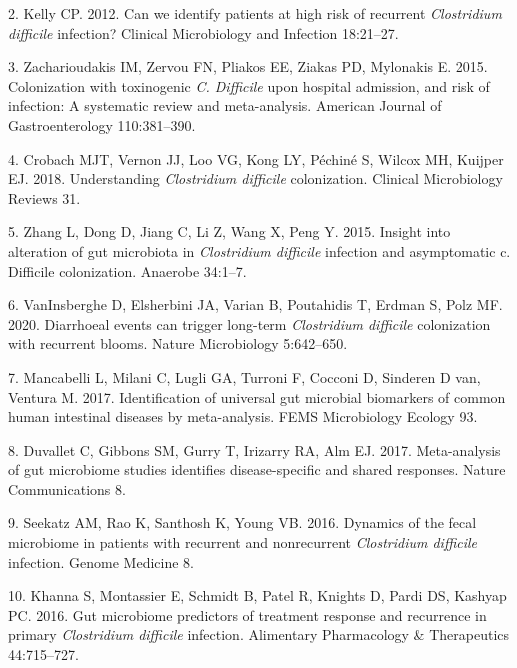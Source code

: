 \documentclass[
  11pt,
]{article}
\begin{document}
\leavevmode\hypertarget{ref-Kelly2012}{}%
2. Kelly CP. 2012. Can we identify patients at high risk of recurrent
\emph{Clostridium difficile} infection? Clinical Microbiology and
Infection 18:21--27.

\leavevmode\hypertarget{ref-Zacharioudakis2015}{}%
3. Zacharioudakis IM, Zervou FN, Pliakos EE, Ziakas PD, Mylonakis E.
2015. Colonization with toxinogenic \emph{C. Difficile} upon hospital
admission, and risk of infection: A systematic review and meta-analysis.
American Journal of Gastroenterology 110:381--390.

\leavevmode\hypertarget{ref-Crobach2018}{}%
4. Crobach MJT, Vernon JJ, Loo VG, Kong LY, Péchiné S, Wilcox MH,
Kuijper EJ. 2018. Understanding \emph{Clostridium difficile}
colonization. Clinical Microbiology Reviews 31.

\leavevmode\hypertarget{ref-Zhang2015}{}%
5. Zhang L, Dong D, Jiang C, Li Z, Wang X, Peng Y. 2015. Insight into
alteration of gut microbiota in \emph{Clostridium difficile} infection
and asymptomatic c. Difficile colonization. Anaerobe 34:1--7.

\leavevmode\hypertarget{ref-VanInsberghe2020}{}%
6. VanInsberghe D, Elsherbini JA, Varian B, Poutahidis T, Erdman S, Polz
MF. 2020. Diarrhoeal events can trigger long-term \emph{Clostridium
difficile} colonization with recurrent blooms. Nature Microbiology
5:642--650.

\leavevmode\hypertarget{ref-Mancabelli2017}{}%
7. Mancabelli L, Milani C, Lugli GA, Turroni F, Cocconi D, Sinderen D
van, Ventura M. 2017. Identification of universal gut microbial
biomarkers of common human intestinal diseases by meta-analysis. FEMS
Microbiology Ecology 93.

\leavevmode\hypertarget{ref-Duvallet2017}{}%
8. Duvallet C, Gibbons SM, Gurry T, Irizarry RA, Alm EJ. 2017.
Meta-analysis of gut microbiome studies identifies disease-specific and
shared responses. Nature Communications 8.

\leavevmode\hypertarget{ref-Seekatz2016}{}%
9. Seekatz AM, Rao K, Santhosh K, Young VB. 2016. Dynamics of the fecal
microbiome in patients with recurrent and nonrecurrent \emph{Clostridium
difficile} infection. Genome Medicine 8.

\leavevmode\hypertarget{ref-Khanna2016}{}%
10. Khanna S, Montassier E, Schmidt B, Patel R, Knights D, Pardi DS,
Kashyap PC. 2016. Gut microbiome predictors of treatment response and
recurrence in primary \emph{Clostridium difficile} infection. Alimentary
Pharmacology \& Therapeutics 44:715--727.
\end{document}

